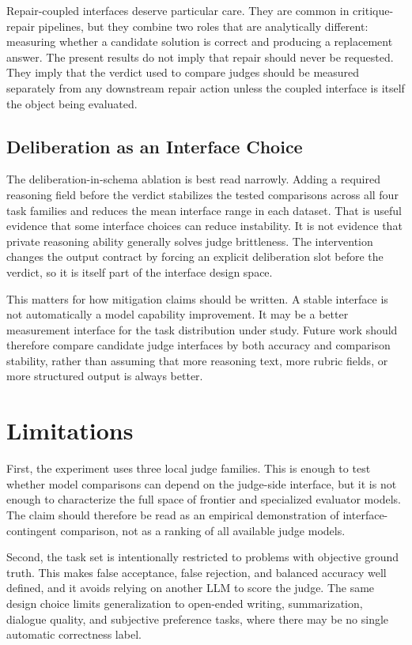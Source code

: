 \documentclass[journal]{IEEEtran}
\begin{document}
Repair-coupled interfaces deserve particular care. They are common in critique-repair pipelines, but they combine two roles that are analytically different: measuring whether a candidate solution is correct and producing a replacement answer. The present results do not imply that repair should never be requested. They imply that the verdict used to compare judges should be measured separately from any downstream repair action unless the coupled interface is itself the object being evaluated.

\subsection{Deliberation as an Interface Choice}
\label{sec:discussion-deliberation}

The deliberation-in-schema ablation is best read narrowly. Adding a required reasoning field before the verdict stabilizes the tested comparisons across all four task families and reduces the mean interface range in each dataset. That is useful evidence that some interface choices can reduce instability. It is not evidence that private reasoning ability generally solves judge brittleness. The intervention changes the output contract by forcing an explicit deliberation slot before the verdict, so it is itself part of the interface design space.

This matters for how mitigation claims should be written. A stable interface is not automatically a model capability improvement. It may be a better measurement interface for the task distribution under study. Future work should therefore compare candidate judge interfaces by both accuracy and comparison stability, rather than assuming that more reasoning text, more rubric fields, or more structured output is always better.

\section{Limitations}
\label{sec:limitations}

First, the experiment uses three local judge families. This is enough to test whether model comparisons can depend on the judge-side interface, but it is not enough to characterize the full space of frontier and specialized evaluator models. The claim should therefore be read as an empirical demonstration of interface-contingent comparison, not as a ranking of all available judge models.

Second, the task set is intentionally restricted to problems with objective ground truth. This makes false acceptance, false rejection, and balanced accuracy well defined, and it avoids relying on another LLM to score the judge. The same design choice limits generalization to open-ended writing, summarization, dialogue quality, and subjective preference tasks, where there may be no single automatic correctness label.
\end{document}
